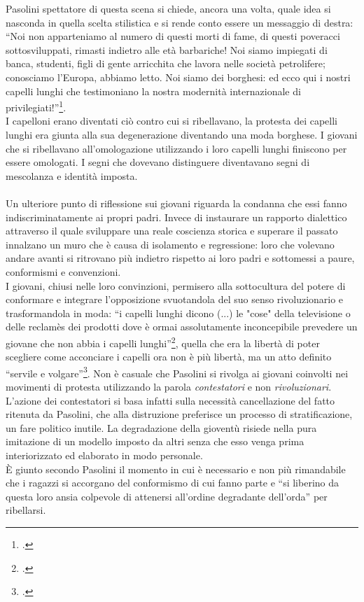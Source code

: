 Pasolini spettatore di questa scena si chiede, ancora una volta, quale idea si nasconda in quella scelta stilistica e si rende conto essere un messaggio di destra: \enquote{Noi non apparteniamo al numero di questi morti di fame, di questi poveracci sottosviluppati, rimasti indietro alle età barbariche! Noi siamo impiegati di banca, studenti, figli di gente arricchita che lavora nelle società petrolifere; conosciamo l'Europa, abbiamo letto. Noi siamo dei borghesi: ed ecco qui i nostri capelli lunghi che testimoniano la nostra modernità internazionale di privilegiati!}\footcite{Scritti6}.
\\I capelloni erano diventati ciò contro cui si ribellavano, la protesta dei capelli lunghi era giunta alla sua degenerazione diventando una moda borghese.
I giovani che si ribellavano all'omologazione utilizzando i loro capelli lunghi finiscono per essere omologati.
I segni che dovevano distinguere diventavano segni di mescolanza e identità imposta.

\paragraph{}Un ulteriore punto di riflessione sui giovani riguarda la condanna che essi fanno indiscriminatamente ai propri padri.
Invece di instaurare un rapporto dialettico attraverso il quale sviluppare una reale coscienza storica e superare il passato innalzano un muro che è causa di isolamento e regressione: loro che volevano andare avanti si ritrovano più indietro rispetto ai loro padri e sottomessi a paure, conformismi e convenzioni.
\\I giovani, chiusi nelle loro convinzioni, permisero alla sottocultura del potere di conformare e integrare l'opposizione svuotandola del suo senso rivoluzionario e trasformandola in moda: \enquote{i capelli lunghi dicono (...) le "cose" della televisione o delle reclamès dei prodotti dove è ormai assolutamente inconcepibile prevedere un giovane che non abbia i capelli lunghi}\footcite{Scritti6}, quella che era la libertà di poter scegliere come acconciare i capelli ora non è più libertà, ma un atto definito \enquote{servile e volgare}\footcite{Scritti6}.
Non è casuale che Pasolini si rivolga ai giovani coinvolti nei movimenti di protesta utilizzando la parola \textit{contestatori} e non \textit{rivoluzionari}.
L'azione dei contestatori si basa infatti sulla necessità cancellazione del fatto ritenuta da Pasolini, che alla distruzione preferisce un processo di stratificazione, un fare politico inutile.
La degradazione della gioventù risiede nella pura imitazione di un modello imposto da altri senza che esso venga prima interiorizzato ed elaborato in modo personale.
\\È giunto secondo Pasolini il momento in cui è necessario e non più rimandabile che i ragazzi si accorgano del conformismo di cui fanno parte e \enquote{si liberino da questa loro ansia colpevole di attenersi all'ordine degradante dell'orda} per ribellarsi.


